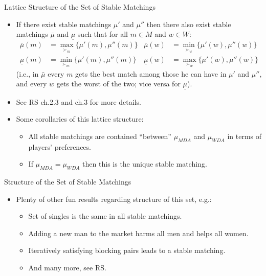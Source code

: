\documentclass[english,10pt
,aspectratio=169
]{beamer}
\begin{document}
\begin{frame}{Lattice Structure of the Set of Stable Matchings}
\begin{itemize}
	\item If there exist stable matchings $\mu'$ and $\mu''$ then there also exist stable matchings $\bar{\mu}$ and $\underline{\mu}$ such that for all $m \in M$ and $w \in W$:
	\begin{align*}
		\bar{\mu}(m) &= \max_{\succ_m} \{\mu'(m), \mu''(m)\}	&
		\bar{\mu}(w) &= \min_{\succ_w} \{\mu'(w), \mu''(w)\}
		\\
		\underline{\mu}(m) &= \min_{\succ_m} \{\mu'(m), \mu''(m)\}	&
		\underline{\mu}(w) &= \max_{\succ_w} \{\mu'(w), \mu''(w)\}
	\end{align*}
	(i.e., in $\bar{\mu}$ every $m$ gets the best match among those he can have in $\mu'$ and $\mu''$, and every $w$ gets the worst of the two; vice versa for $\underline{\mu}$).
	\item See RS ch.2.3 and ch.3 for more details.
	\item Some corollaries of this lattice structure:
	\begin{itemize}
		\item All stable matchings are contained ``between'' $\mu_{MDA}$ and $\mu_{WDA}$ in terms of players' preferences.
		\item If $\mu_{MDA} = \mu_{WDA}$ then this is the unique stable matching.
	\end{itemize}
\end{itemize}
\end{frame}


\begin{frame}{Structure of the Set of Stable Matchings}
\begin{itemize}
	\item Plenty of other fun results regarding structure of this set, e.g.:
	\begin{itemize}
		\item Set of singles is the same in all stable matchings.
		\item Adding a new man to the market harms all men and helps all women.
		\item Iteratively satisfying blocking pairs leads to a stable matching.
		\item And many more, see RS.
	\end{itemize}
\end{itemize}
\end{frame}
\end{document}
